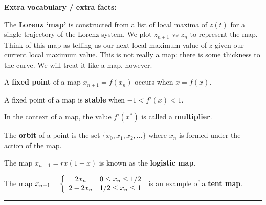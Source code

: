 \documentclass[12pt,letterpaper,noanswers]{exam}
\begin{document}
\noindent \textbf{Extra vocabulary / extra facts:}
\begin{tcolorbox}
The \textbf{Lorenz `map'} is constructed from a list of local maxima of $z(t)$ for a single trajectory of the Lorenz system.  We plot $z_{n+1}$ vs $z_n$ to represent the map.  Think of this map as telling us our next local maximum value of $z$ given our current local maximum value.  This is not really a map: there is some thickness to the curve.  We will treat it like a map, however.

A \textbf{fixed point} of a map $x_{n+1} = f(x_n)$ occurs when $x = f(x)$.

A fixed point of a map is \textbf{stable} when $-1 < f'(x) < 1$.

In the context of a map, the value $f'(x^*)$ is called a \textbf{multiplier}.

The \textbf{orbit} of a point is the set $\{x_0, x_1, x_2, ...\}$ where $x_n$ is formed under the action of the map.

The map $x_{n+1} = rx(1-x)$ is known as the \textbf{logistic map}.

The map $x_{n+1} = \left\{\begin{array}{c c}2x_n & 0\leq x_n \leq 1/2 \\ 2-2x_n & 1/2 \leq x_n \leq 1 \end{array} \right.$ is an example of a \textbf{tent map}.
\end{tcolorbox}

\vspace{0.2cm}
\hrule
\vspace{0.2cm}
\end{document}
